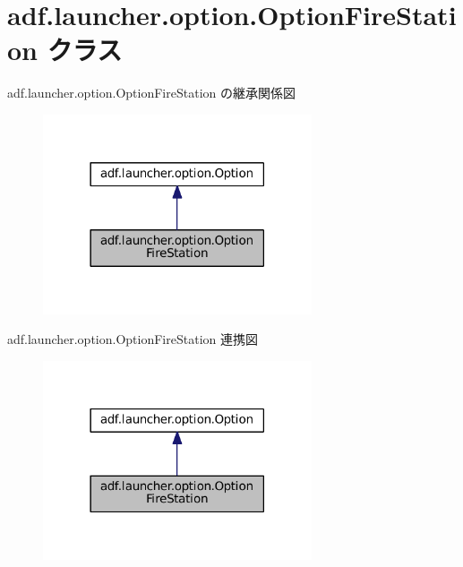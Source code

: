 \hypertarget{classadf_1_1launcher_1_1option_1_1OptionFireStation}{}\section{adf.\+launcher.\+option.\+Option\+Fire\+Station クラス}
\label{classadf_1_1launcher_1_1option_1_1OptionFireStation}


adf.\+launcher.\+option.\+Option\+Fire\+Station の継承関係図
\nopagebreak
\begin{figure}[H]
\begin{center}
\leavevmode
\includegraphics[width=225pt]{classadf_1_1launcher_1_1option_1_1OptionFireStation__inherit__graph}
\end{center}
\end{figure}


adf.\+launcher.\+option.\+Option\+Fire\+Station 連携図
\nopagebreak
\begin{figure}[H]
\begin{center}
\leavevmode
\includegraphics[width=225pt]{classadf_1_1launcher_1_1option_1_1OptionFireStation__coll__graph}
\end{center}
\end{figure}
